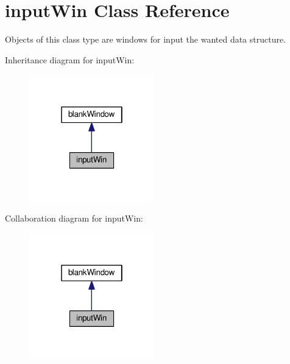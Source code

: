 \hypertarget{classgui_1_1window3a_1_1inputWin}{\section{input\-Win Class Reference}
\label{classgui_1_1window3a_1_1inputWin}
}


Objects of this class type are windows for input the wanted data structure.  




Inheritance diagram for input\-Win\-:\nopagebreak
\begin{figure}[H]
\begin{center}
\leavevmode
\includegraphics[width=154pt]{classgui_1_1window3a_1_1inputWin__inherit__graph}
\end{center}
\end{figure}


Collaboration diagram for input\-Win\-:\nopagebreak
\begin{figure}[H]
\begin{center}
\leavevmode
\includegraphics[width=154pt]{classgui_1_1window3a_1_1inputWin__coll__graph}
\end{center}
\end{figure}
